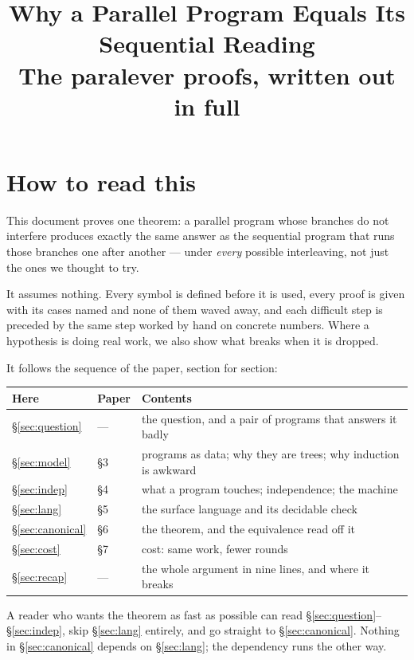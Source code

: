 \documentclass[11pt,a4paper]{article}
\title{Why a Parallel Program Equals Its Sequential Reading\\
       \large The paralever proofs, written out in full}
\author{}
\date{}
\theoremstyle{definition}
\theoremstyle{plain}
\theoremstyle{remark}
\begin{document}
\maketitle
\vspace{-3em}

\section*{How to read this}

This document proves one theorem: a parallel program whose branches do not interfere
produces exactly the same answer as the sequential program that runs those branches one
after another --- under \emph{every} possible interleaving, not just the ones we thought
to try.

It assumes nothing. Every symbol is defined before it is used, every proof is given with
its cases named and none of them waved away, and each difficult step is preceded by the
same step worked by hand on concrete numbers. Where a hypothesis is doing real work, we
also show what breaks when it is dropped.

It follows the sequence of the paper, section for section:

\begin{center}\small
\begin{tabular}{@{}lll@{}}
\toprule
\textbf{Here} & \textbf{Paper} & \textbf{Contents} \\
\midrule
\S\ref{sec:question}  & ---   & the question, and a pair of programs that answers it badly \\
\S\ref{sec:model}     & \S3   & programs as data; why they are trees; why induction is awkward \\
\S\ref{sec:indep}     & \S4   & what a program touches; independence; the machine \\
\S\ref{sec:lang}      & \S5   & the surface language and its decidable check \\
\S\ref{sec:canonical} & \S6   & the theorem, and the equivalence read off it \\
\S\ref{sec:cost}      & \S7   & cost: same work, fewer rounds \\
\S\ref{sec:recap}     & ---   & the whole argument in nine lines, and where it breaks \\
\bottomrule
\end{tabular}
\end{center}

\noindent A reader who wants the theorem as fast as possible can read
\S\ref{sec:question}--\S\ref{sec:indep}, skip \S\ref{sec:lang} entirely, and go straight to
\S\ref{sec:canonical}. Nothing in \S\ref{sec:canonical} depends on \S\ref{sec:lang}; the
dependency runs the other way.
\end{document}
